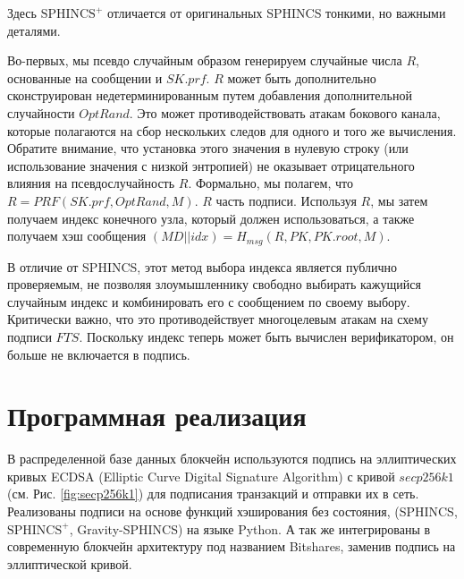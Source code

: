 \documentclass[a4paper, 14pt]{extarticle}
\begin{document}
Здесь $\text{SPHINCS}^{+}$ отличается от оригинальных SPHINCS тонкими, но важными деталями.

Во-первых, мы псевдо случайным образом генерируем случайные числа $R$, основанные на сообщении и $SK.prf$. $R$ может быть дополнительно сконструирован недетерминированным путем добавления дополнительной случайности $OptRand$. Это может противодействовать атакам бокового канала, которые полагаются на сбор нескольких следов для одного и того же вычисления. Обратите внимание, что установка этого значения в нулевую строку (или использование значения с низкой энтропией) не оказывает отрицательного влияния на псевдослучайность $R$. Формально, мы полагем, что $R = PRF(SK.prf, OptRand, M)$. $R$ часть подписи. Используя $R$, мы затем получаем индекс конечного узла, который должен использоваться, а также получаем хэш сообщения $(MD||idx) = H_{msg}(R, PK, PK.root, M)$.

В отличие от SPHINCS, этот метод выбора индекса является публично проверяемым, не позволяя злоумышленнику свободно выбирать кажущийся случайным индекс и комбинировать его с сообщением по своему выбору. Критически важно, что это противодействует многоцелевым атакам на схему подписи $FTS$. Поскольку индекс теперь может быть вычислен верификатором, он больше не включается в подпись.
\newpage

\section{Программная реализация}
В распределенной базе данных блокчейн используются подпись на эллиптических кривых ECDSA (Elliptic Curve Digital Signature Algorithm) с кривой $secp256k1$ (см. Рис. \ref{fig:secp256k1}) для подписания транзакций и отправки их в сеть. Реализованы подписи на основе функций хэширования без состояния, (SPHINCS, $\text{SPHINCS}^{+}$, Gravity-SPHINCS) на языке Python. А так же интегрированы в современную блокчейн архитектуру под названием Bitshares, заменив подпись на эллиптической кривой.
\end{document}
